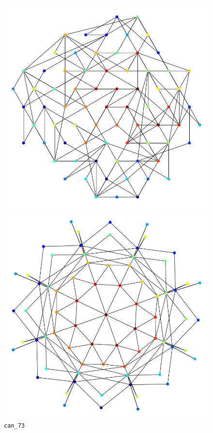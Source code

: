 \documentclass[dvipdfmx,journal]{IEEEtran}
\begin{document}
\begin{figure}[t]
    \centering
    \begin{minipage}{0.49\columnwidth}
        \centering
        \includegraphics[width=0.5\columnwidth]{overall/viz/can_73_SN_L_BFGS_first.png}
    \end{minipage}
    \begin{minipage}{0.49\columnwidth}
        \centering
        \includegraphics[width=0.5\columnwidth]{overall/viz/can_73_SN_L_BFGS_last.png}
    \end{minipage}
    \caption{\texttt{can\_73}}
    \label{fig:can_73}
\end{figure}
\end{document}
